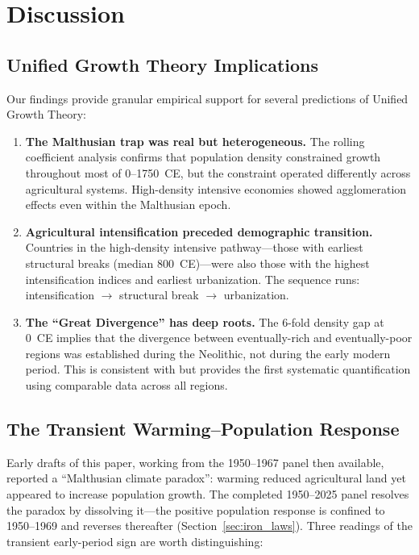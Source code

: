 \documentclass[12pt,letterpaper]{article}
\begin{document}
\section{Discussion}

\subsection{Unified Growth Theory Implications}

Our findings provide granular empirical support for several predictions of Unified Growth Theory:

\begin{enumerate}[nosep]
  \item \textbf{The Malthusian trap was real but heterogeneous.} The rolling coefficient analysis confirms that population density constrained growth throughout most of 0--1750~CE, but the constraint operated differently across agricultural systems. High-density intensive economies showed agglomeration effects even within the Malthusian epoch.

  \item \textbf{Agricultural intensification preceded demographic transition.} Countries in the high-density intensive pathway---those with earliest structural breaks (median 800~CE)---were also those with the highest intensification indices and earliest urbanization. The sequence runs: intensification $\to$ structural break $\to$ urbanization.

  \item \textbf{The ``Great Divergence'' has deep roots.} The 6-fold density gap at 0~CE implies that the divergence between eventually-rich and eventually-poor regions was established during the Neolithic, not during the early modern period. This is consistent with \citet{diamond1997} but provides the first systematic quantification using comparable data across all regions.
\end{enumerate}

\subsection{The Transient Warming--Population Response}

Early drafts of this paper, working from the 1950--1967 panel then available, reported a ``Malthusian climate paradox'': warming reduced agricultural land yet appeared to increase population growth. The completed 1950--2025 panel resolves the paradox by dissolving it---the positive population response is confined to 1950--1969 and reverses thereafter (Section~\ref{sec:iron_laws}). Three readings of the transient early-period sign are worth distinguishing:
\end{document}
